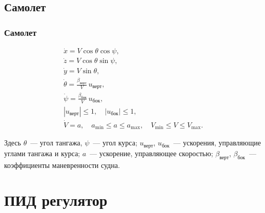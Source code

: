 \documentclass[10pt,t]{beamer}
\begin{document}
\subsection[Самолет]{Самолет}
\begin{frame}
\frametitle{Самолет}
\small

\begin{equation*}
  \begin{array}{l}
    \dot x = V \cos \theta \cos \psi, \\[0.75ex]
    \dot z = V \cos \theta \sin \psi, \\[0.75ex]
    \dot y = V \sin \theta, \\[0.75ex]
    \dot \theta = \frac{\beta_\text{верт}}{V} \, u_\text{верт}, \\[0.75ex]
    \dot \psi   = \frac{\beta_\text{бок}}{V} \, u_\text{бок}, \\[0.75ex]
    |u_\text{верт}| \leqslant 1, 
      \quad |u_\text{бок}| \leqslant 1, \\[0.75ex]
    \dot V = a, \quad  
      a_{\min} \leqslant a \leqslant a_{\max},
      \quad V_{\min} \leqslant V \leqslant V_{\max}.
  \end{array}
\end{equation*}

Здесь $\theta$~--- угол тангажа, $\psi$~--- угол курса; $u_\text{верт}$, $u_\text{бок}$~--- ускорения, управляющие углами тангажа и курса; $a$~--- ускорение, управляющее скоростью; $\beta_\text{верт}$, $\beta_\text{бок}$~--- коэффициенты маневренности судна. 

\end{frame}
\section[ПИД регулятор]{ПИД регулятор}
\end{document}
